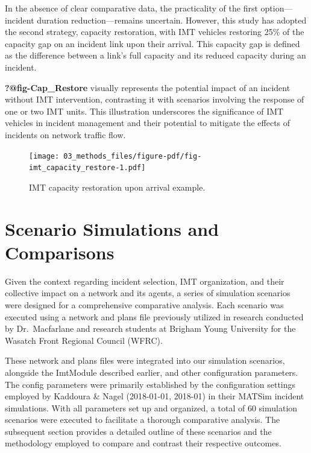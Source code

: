 \documentclass[fancy, oneside, mastersfancy, ms]{byuthesis}
\begin{document}
In the absence of clear comparative data, the practicality of the first
option---incident duration reduction---remains uncertain. However, this
study has adopted the second strategy, capacity restoration, with IMT
vehicles restoring 25\% of the capacity gap on an incident link upon
their arrival. This capacity gap is defined as the difference between a
link's full capacity and its reduced capacity during an incident.

\textbf{?@fig-Cap\_Restore} visually represents the potential impact of
an incident without IMT intervention, contrasting it with scenarios
involving the response of one or two IMT units. This illustration
underscores the significance of IMT vehicles in incident management and
their potential to mitigate the effects of incidents on network traffic
flow.

\begin{figure}

{\centering \texttt{[image: 03\_methods\_files/figure-pdf/fig-imt\_capacity\_restore-1.pdf]}

}

\caption{\label{fig-imt_capacity_restore}IMT capacity restoration upon
arrival example.}

\end{figure}

\hypertarget{scenario-simulations-and-comparisons}{%
\section{Scenario Simulations and
Comparisons}\label{scenario-simulations-and-comparisons}}

Given the context regarding incident selection, IMT organization, and
their collective impact on a network and its agents, a series of
simulation scenarios were designed for a comprehensive comparative
analysis. Each scenario was executed using a network and plans file
previously utilized in research conducted by Dr.~Macfarlane and research
students at Brigham Young University for the Wasatch Front Regional
Council (WFRC).

These network and plans files were integrated into our simulation
scenarios, alongside the ImtModule described earlier, and other
configuration parameters. The config parameters were primarily
established by the configuration settings employed by Kaddoura \& Nagel
(2018-01-01, 2018-01) in their MATSim incident simulations. With all
parameters set up and organized, a total of 60 simulation scenarios were
executed to facilitate a thorough comparative analysis. The subsequent
section provides a detailed outline of these scenarios and the
methodology employed to compare and contrast their respective outcomes.
\end{document}

